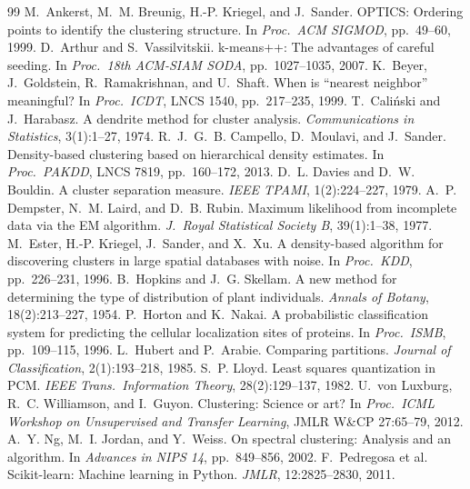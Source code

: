 \begin{thebibliography}{99}\small\itemsep0pt
 M.~Ankerst, M.~M. Breunig, H.-P. Kriegel, and J.~Sander. OPTICS: Ordering points to identify the clustering structure. In \emph{Proc.\ ACM SIGMOD}, pp.~49--60, 1999.
 D.~Arthur and S.~Vassilvitskii. k-means++: The advantages of careful seeding. In \emph{Proc.\ 18th ACM-SIAM SODA}, pp.~1027--1035, 2007.
 K.~Beyer, J.~Goldstein, R.~Ramakrishnan, and U.~Shaft. When is ``nearest neighbor'' meaningful? In \emph{Proc.\ ICDT}, LNCS 1540, pp.~217--235, 1999.
 T.~Cali\'nski and J.~Harabasz. A dendrite method for cluster analysis. \emph{Communications in Statistics}, 3(1):1--27, 1974.
 R.~J.~G.~B. Campello, D.~Moulavi, and J.~Sander. Density-based clustering based on hierarchical density estimates. In \emph{Proc.\ PAKDD}, LNCS 7819, pp.~160--172, 2013.
 D.~L. Davies and D.~W. Bouldin. A cluster separation measure. \emph{IEEE TPAMI}, 1(2):224--227, 1979.
 A.~P. Dempster, N.~M. Laird, and D.~B. Rubin. Maximum likelihood from incomplete data via the EM algorithm. \emph{J.\ Royal Statistical Society B}, 39(1):1--38, 1977.
 M.~Ester, H.-P. Kriegel, J.~Sander, and X.~Xu. A density-based algorithm for discovering clusters in large spatial databases with noise. In \emph{Proc.\ KDD}, pp.~226--231, 1996.
 B.~Hopkins and J.~G. Skellam. A new method for determining the type of distribution of plant individuals. \emph{Annals of Botany}, 18(2):213--227, 1954.
 P.~Horton and K.~Nakai. A probabilistic classification system for predicting the cellular localization sites of proteins. In \emph{Proc.\ ISMB}, pp.~109--115, 1996.
 L.~Hubert and P.~Arabie. Comparing partitions. \emph{Journal of Classification}, 2(1):193--218, 1985.
 S.~P. Lloyd. Least squares quantization in PCM. \emph{IEEE Trans.\ Information Theory}, 28(2):129--137, 1982.
 U.~von Luxburg, R.~C. Williamson, and I.~Guyon. Clustering: Science or art? In \emph{Proc.\ ICML Workshop on Unsupervised and Transfer Learning}, JMLR W\&CP 27:65--79, 2012.
 A.~Y. Ng, M.~I. Jordan, and Y.~Weiss. On spectral clustering: Analysis and an algorithm. In \emph{Advances in NIPS 14}, pp.~849--856, 2002.
 F.~Pedregosa et al. Scikit-learn: Machine learning in Python. \emph{JMLR}, 12:2825--2830, 2011.

\end{thebibliography}
